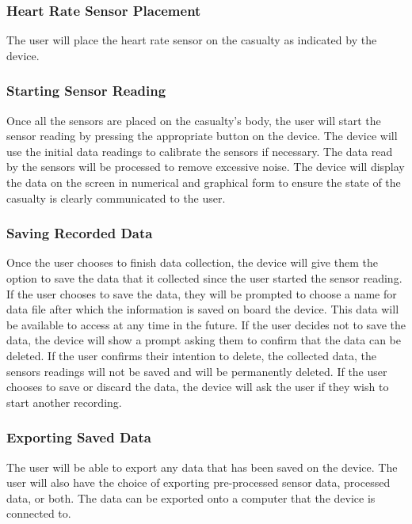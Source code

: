\documentclass{article}
\begin{document}
	\subsubsection{Heart Rate Sensor Placement }
	The user will place the heart rate sensor on the casualty as indicated by the device. 
	\subsubsection{Starting Sensor Reading}
	Once all the sensors are placed on the casualty's body, the user will start the sensor reading by pressing the appropriate button on the device. The device will use the initial data readings to calibrate the sensors if necessary. The data read by the sensors will be processed to remove excessive noise. The device will display the data on the screen in numerical and graphical form to ensure the state of the casualty is clearly communicated to the user.
	\subsubsection{Saving Recorded Data}
	Once the user chooses to finish data collection, the device will give them the option to save the data that it collected since the user started the sensor reading. If the user chooses to save the data, they will be prompted to choose a name for data file after which the information is saved on board the device. This data will be available to access at any time in the future. If the user decides not to save the data, the device will show a prompt asking them to confirm that the data can be deleted. If the user confirms their intention to delete, the collected data, the sensors readings will not be saved and will be permanently deleted.  If the user chooses to save or discard the data, the device will ask the user if they wish to start another recording.
	\subsubsection{Exporting Saved Data}
	The user will be able to export any data that has been saved on the device. The user will also have the choice of exporting pre-processed sensor data, processed data, or both. The data can be exported onto a computer that the device is connected to. 
\end{document}
